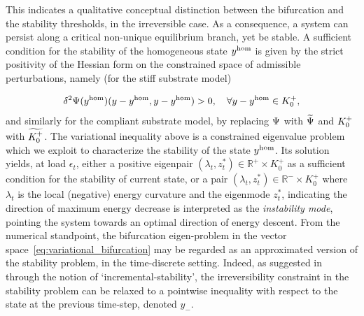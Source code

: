 This indicates a qualitative conceptual distinction between the bifurcation and the stability thresholds, in the irreversible case. As a consequence, a system can persist along a critical non-unique equilibrium branch, yet be stable.
A sufficient condition for the stability of the homogeneous state $y^{\text{hom}}$ is given by the strict positivity  of the Hessian form on the constrained space of admissible perturbations, namely (for the stiff substrate model)

\begin{equation}
    \label{eq:variational_stability}
    \delta^2 \Psi(y^{\text{hom}})(y - y^{\text{hom}},  y - y^{\text{hom}})  > 0, \quad \forall y-y^{\text{hom}} \in K^+_{0},
\end{equation}
and similarly for the compliant substrate model, by replacing $\Psi$ with $\widetilde\Psi$ and $K^+_{0}$ with $\widetilde{K^+_{0}}$.
The variational inequality above is a constrained eigenvalue problem which we exploit to characterize the stability of the state $y^{\text{hom}}$. Its solution yields, at load $\epsilon_t$, either a positive eigenpair $(\lambda_t, z^*_t)\in \mathbb{R}^+\times K^+_0$ as a sufficient condition for the stability of current state, or a pair $(\lambda_t, z^*_t)\in \mathbb{R}^-\times K^+_0$ where $\lambda_t$ is the local (negative) energy curvature and the eigenmode $z^*_t$, indicating the direction of maximum energy decrease is interpreted as the \emph{instability mode}, pointing the system towards an optimal direction of energy descent.
From the numerical standpoint, the bifurcation eigen-problem in the vector space~\eqref{eq:variational_bifurcation} may be regarded as an approximated version of the stability problem, in the time-discrete setting. Indeed, as suggested in~\cite{Baldelli2021-gc} through the notion of `incremental-stability', the irreversibility constraint in the stability problem can be relaxed to a pointwise inequality with respect to the state at the previous time-step, denoted $y_-$.
